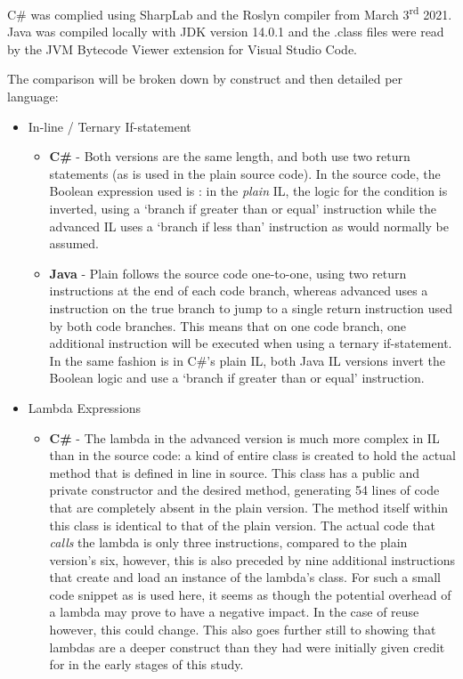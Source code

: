 \documentclass{article}
\begin{document}
        C\# was complied using SharpLab and the Roslyn compiler from March 3\textsuperscript{rd} 2021. Java was compiled locally with JDK version 14.0.1 and the .class files were read by the JVM Bytecode Viewer extension for Visual Studio Code.

        The comparison will be broken down by construct and then detailed per language:

        \begin{itemize}
            \item In-line / Ternary If-statement
            \begin{itemize}
                \item \textbf{C\#} - Both versions are the same length, and both use two return statements (as is used in the plain source code). In the source code, the Boolean expression used is : in the \emph{plain} IL, the logic for the condition is inverted, using a `branch if greater than or equal' instruction while the advanced IL uses a `branch if less than' instruction as would normally be assumed.
                \item \textbf{Java} - Plain follows the source code one-to-one, using two return instructions at the end of each code branch, whereas advanced uses a  instruction on the true branch to jump to a single return instruction used by both code branches. This means that on one code branch, one additional instruction will be executed when using a ternary if-statement. In the same fashion is in C\#'s plain IL, both Java IL versions invert the Boolean logic and use a `branch if greater than or equal' instruction.
            \end{itemize}
            \item Lambda Expressions
            \begin{itemize}
                \item \textbf{C\#} - The lambda in the advanced version is much more complex in IL than in the source code: a kind of entire class is created to hold the actual method that is defined in line in source. This class has a public and private constructor and the desired method, generating 54 lines of code that are completely absent in the plain version. The method itself within this class is identical to that of the plain version. The actual code that \emph{calls} the lambda is only three instructions, compared to the plain version's six, however, this is also preceded by nine additional instructions that create and load an instance of the lambda's class. For such a small code snippet as is used here, it seems as though the potential overhead of a lambda may prove to have a negative impact. In the case of reuse however, this could change. This also goes further still to showing that lambdas are a deeper construct than they had were initially given credit for in the early stages of this study.

\end{itemize}
\end{itemize}
\end{document}
